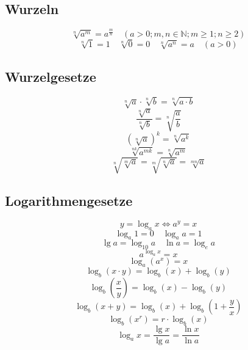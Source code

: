 \subsection{Wurzeln}
\[ \boxed{\sqrt[n]{a^m} = a^{\frac{m}{n}} \quad \left(a>0; m, n \in \mathbb{N}; m \geq 1; n \geq 2\right)} \]
\[ \boxed{\sqrt[n]{1}=1 \quad \sqrt[n]{0}=0 \quad \sqrt[n]{a^n}=a \quad \left(a>0\right)} \]

\subsection{Wurzelgesetze}
\[ \boxed{\sqrt[n]{a}\cdot \sqrt[n]{b}=\sqrt[n]{a\cdot b}} \]
\[ \boxed{\frac{\sqrt[n]{a}}{\sqrt[n]{b}}=\sqrt[n]{\frac{a}{b}}} \]
\[ \boxed{\left(\sqrt[n]{a}\right)^k=\sqrt[n]{a^k}} \]
\[ \boxed{\sqrt[nk]{a^{mk}}=\sqrt[n]{a^m}} \]
\[ \boxed{\sqrt[n]{\sqrt[m]{a}}=\sqrt[m]{\sqrt[n]{a}}=\sqrt[mn]{a}} \]

\subsection{Logarithmengesetze}
\[ \boxed{y=\log_ax \Leftrightarrow a^y=x} \]
\[ \boxed{\log_a1=0 \quad \log_aa=1} \]
\[ \boxed{\lg a=\log_{10}a \quad \ln a = \log_ea} \]
\[ \boxed{a^{\log_ax}=x} \]
\[ \boxed{\log_a\left(a^x\right)=x} \]
\[ \boxed{\log_b\left(x \cdot y\right) = \log_b\left(x\right) + \log_b\left(y\right)} \]
\[ \boxed{\log_b \left( \frac{x}{y} \right) = \log_b\left(x\right) - \log_b\left(y\right)} \]
\[ \boxed{\log_b\left(x + y\right) = \log_b\left(x\right) + \log_b\left(1 + \frac{y}{x}\right)} \]
\[ \boxed{\log_b\left(x^r\right) = r \cdot \log_b\left(x\right)} \]
\[ \boxed{\log_ax=\frac{\lg x}{\lg a}=\frac{\ln x}{\ln a}} \]

